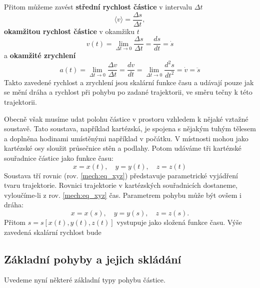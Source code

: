 {    Přitom můžeme zavést \textbf{střední rychlost částice} v intervalu $\Delta t$
    \begin{equation}\label{mech:eq_stredni_rychlost}
      \langle v\rangle=\frac{\Delta s}{\Delta t},
    \end{equation}
    \textbf{okamžitou rychlost částice} v okamžiku $t$
    \begin{equation}\label{mech:eq_okamzita_rychlost}
      v(t)=\lim_{\Delta t\rightarrow0}\frac{\Delta s}{\Delta t}=\frac{ds}{dt}=\dot{s}
    \end{equation}
    a \textbf{okamžité zrychlení}
    \begin{equation}\label{mech:eq_okamzite_zrychleni}
      a(t)=\lim_{\Delta t\rightarrow0}\frac{\Delta v}{\Delta t}
          =\frac{dv}{dt}=\lim_{\Delta t\rightarrow0}\frac{d^2s}{dt^2}=\dot{v}=\ddot{s}
    \end{equation}
    Takto zavedené rychlost a zrychlení jsou skalární funkce času a udávají pouze jak se mění dráha
    a rychlost při pohybu po zadané trajektorii, ve směru tečny k této trajektorii.
  
    Obecně však musíme udat polohu částice v prostoru vzhledem k nějaké vztažné soustavě. Tato
    soustava, například kartézská, je spojena s nějakým tuhým tělesem a doplněna hodinami
    umístěnými   například v počátku. V místnosti mohou jako kartézské osy sloužit průsečnice stěn
    a podlahy. Potom udáváme tři kartézské souřadnice částice jako funkce času:
    \begin{equation}\label{mech:eq_xyz}
      x=x(t),\quad y=y(t),\quad z=z(t)
    \end{equation}
    Soustava tří rovnic (rov. \ref{mech:eq_xyz}) představuje parametrické vyjádření tvaru
    trajektorie. Rovnici trajektorie v kartézských souřadnicích dostaneme, vyloučíme-li z rov.
    \ref{mech:eq_xyz} čas. Parametrem pohybu může být ovšem i dráha:
    \begin{equation}\label{mech:eq_draha}
      x = x(s),\quad y = y(s),\quad z = z(s).
    \end{equation}
    Přitom $s = s[x(t), y(t), z(t)]$ vystupuje jako složená funkce času. Výše zavedená skalární
    rychlost bude
  
    \subsection{Základní pohyby a jejich skládání}
      Uvedeme nyní některé základní typy pohybu částice.
}
